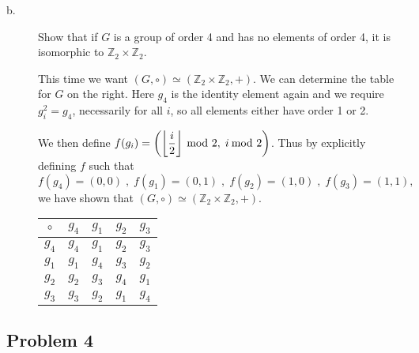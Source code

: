 \documentclass[../hw_sols.tex]{subfiles}
\begin{document}
\begin{description}
\begin{solution}
\end{solution}


\item[b.] Show that if $G$ is a group of order 4 and has no elements of order 
4, it is isomorphic to $\mathbb{Z}_2 \times \mathbb{Z}_2$.

\begin{solution}

This time we want $(G,\circ) \simeq (\mathbb{Z}_2 \times \mathbb{Z}_2, +)$. 
We can determine the table for $G$ on the right. Here $g_4$ is the identity 
element again and we require $g_i^2 = g_4$, necessarily for all $i$, so all 
elements either have order 1 or 2. 

\begin{minipage}{0.65\linewidth}
We then define 
$\displaystyle f(g_i) = 
\left( 
	\left\lfloor \frac{i}{2} \right\rfloor \tmod{2}, \; i \tmod{2} 
\right)$.
Thus by explicitly defining $f$ such that
	$$f(g_4) = (0,0) \; , \; 
	f(g_1) = (0,1) \; , \; 
	f(g_2) = (1,0) \; , \; 
	f(g_3) = (1,1),$$
we have shown that $(G,\circ) \simeq (\mathbb{Z}_2 \times \mathbb{Z}_2, +)$.
\end{minipage}
\quad\quad
\begin{minipage}{0.25\linewidth}
\begin{tabular}{ c | c | c | c | c }
	$\circ$ & $g_4$ & $g_1$ & $g_2$ & $g_3$ \\
	\hline
	$g_4$ & $g_4$ & $g_1$ & $g_2$ & $g_3$ \\
	\hline
	$g_1$ & $g_1$ & $g_4$ & $g_3$ & $g_2$ \\
	\hline
	$g_2$ & $g_2$ & $g_3$ & $g_4$ & $g_1$ \\
	\hline
	$g_3$ & $g_3$ & $g_2$ & $g_1$ & $g_4$ \\
\end{tabular}
\end{minipage}

\end{solution}

\end{description}


\newpage



\subsection*{Problem 4}
\end{document}
